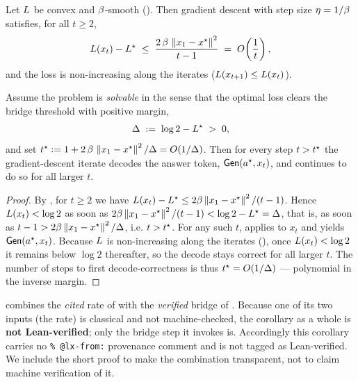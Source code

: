 \begin{proposition}
\label{prop:gd_rate}
Let $L$ be convex and $\beta$-smooth (). Then gradient descent with step
size $\eta = 1/\beta$ satisfies, for all $t \ge 2$,
\begin{align*}
L(x_t) - L^{\star} \;\le\; \frac{2\,\beta\,\left\| x_1 - x^{\star} \right\|^2}{t - 1} \;=\; O\!\left(\frac{1}{t}\right),
\end{align*}
and the loss is non-increasing along the iterates ($L(x_{t+1}) \le L(x_t)$).
\end{proposition}

\begin{corollary}
\label{cor:decode_time}
Assume the problem is \emph{solvable} in the sense that the optimal loss clears the bridge
threshold with positive margin,
\begin{align*}
\Delta \;:=\; \log 2 - L^{\star} \;>\; 0,
\end{align*}
and set $t^{\star} := 1 + 2\,\beta\,\left\| x_1 - x^{\star} \right\|^2 / \Delta = O(1/\Delta)$. Then for
every step $t > t^{\star}$ the gradient-descent iterate decodes the answer token,
$\mathsf{Gen}(a^{\star}, x_t)$, and continues to do so for all larger $t$.
\end{corollary}

\begin{proof}
By , for $t \ge 2$ we have
$L(x_t) - L^{\star} \le 2\beta\left\| x_1 - x^{\star} \right\|^2/(t-1)$. Hence
$L(x_t) < \log 2$ as soon as $2\beta\left\| x_1 - x^{\star} \right\|^2/(t-1) < \log 2 - L^{\star} = \Delta$,
that is, as soon as $t - 1 > 2\beta\left\| x_1 - x^{\star} \right\|^2/\Delta$, i.e. $t > t^{\star}$. For
any such $t$,  applies to $x_t$ and yields
$\mathsf{Gen}(a^{\star}, x_t)$. Because $L$ is non-increasing along the iterates
(), once $L(x_t) < \log 2$ it remains below $\log 2$ thereafter, so the
decode stays correct for all larger $t$. The number of steps to first decode-correctness is
thus $t^{\star} = O(1/\Delta)$ --- polynomial in the inverse margin.
\end{proof}

\begin{remark}
\label{rem:cor-not-verified}
 combines the \emph{cited} rate of  with the
\emph{verified} bridge of . Because one of its two inputs
(the rate) is classical and not machine-checked, the corollary as a whole is \textbf{not
Lean-verified}; only the bridge step it invokes is. Accordingly this corollary carries no
\verb|% @lx-from:| provenance comment and is not tagged as Lean-verified. We include the short
proof to make the combination transparent, not to claim machine verification of it.
\end{remark}

